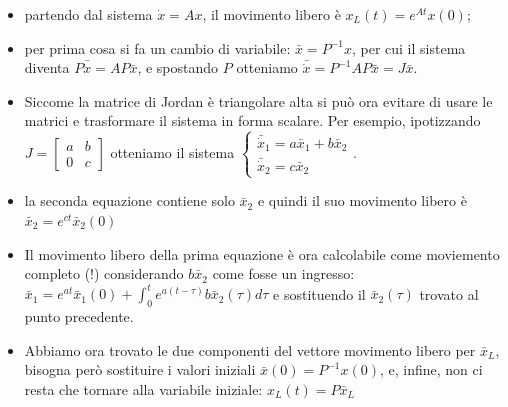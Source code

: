     \begin{itemize}
        \item partendo dal sistema $\dot{x} = A x$, il movimento libero è $x_L(t) = e^{At}x(0)$;
        \item per prima cosa si fa un cambio di variabile: $\bar{x} = P^{-1}x$, per cui il sistema diventa $P \bar{\dot{x}} = A P \bar{x}$, e spostando $P$ otteniamo $\bar{\dot{x}} = P^{-1} A P \bar{x} = J \bar{x}$.
        \item Siccome la matrice di Jordan è triangolare alta si può ora evitare di usare le matrici e trasformare il sistema in forma scalare. Per esempio, ipotizzando $J = \left[\begin{matrix}
            a & b \\ 0 & c
        \end{matrix}\right]$ otteniamo il sistema $\begin{cases}
            \bar{\dot{x}}_1 = a \bar{x}_1 + b \bar{x}_2\\
            \bar{\dot{x}}_2 = c \bar{x}_2
        \end{cases}$.
        \item la seconda equazione contiene solo $\bar{x}_2$ e quindi il suo movimento libero è $\bar{x}_2 = e^{ct}\bar{x}_2(0)$
        \item Il movimento libero della prima equazione è ora calcolabile come moviemento completo (!) considerando $b \bar{x}_2$ come fosse un ingresso: $\bar{x}_1 = e^{at}\bar{x}_1(0) + \int_{0}^{t} e^{a(t-\tau)} b \bar{x}_2(\tau) d \tau$ e sostituendo il $\bar{x}_2(\tau)$ trovato al punto precedente.
        \item Abbiamo ora trovato le due componenti del vettore movimento libero per $\bar{x}_L$, bisogna però sostituire i valori iniziali $\bar{x}(0) = P^{-1}x(0)$, e, infine, non ci resta che tornare alla variabile iniziale: $x_L (t) = P \bar{x}_L$
    \end{itemize}
